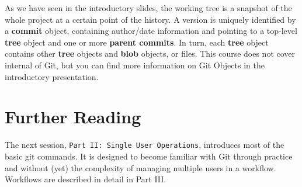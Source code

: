 \documentclass{../common/tufte-latex/tufte-handout}
\begin{document}
As we have seen in the introductory slides, the working tree is a snapshot of the whole project at a certain point of the history.
A version is uniquely identified by a \textbf{commit} object, containing author/date information and pointing to a top-level \textbf{tree} object and one or more \textbf{parent commits}.
In turn, each \textbf{tree} object contains other \textbf{tree} objects and \textbf{blob} objects, or files.
This course does not cover internal of Git, but you can find more information on Git Objects in the introductory presentation.

\section{Further Reading}

The next session, \texttt{Part II: Single User Operations}, introduces most of the basic git commands. It is designed to become familiar with Git through practice and without (yet) the complexity of managing multiple users in a workflow. Workflows are described in detail in Part III.



\end{document}
